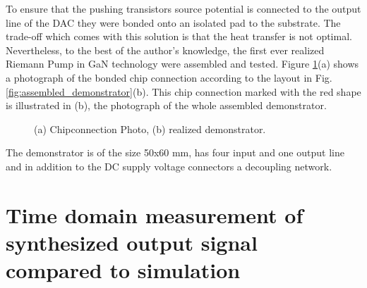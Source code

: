 \documentclass[journal]{IEEEtran}
\begin{document}
To ensure that the pushing transistors source potential is connected to the output line of the DAC they were bonded onto an isolated pad to the substrate.
The trade-off which comes with this solution is that the heat transfer is not optimal.\\
Nevertheless, to the best of the author's knowledge, the first ever realized Riemann Pump in GaN technology were assembled and tested.
Figure \ref{fig:photo_chipconnection_demonstrator}(a) shows a photograph of the bonded chip connection according to the layout in Fig. \ref{fig:assembled_demonstrator}(b).
This chip connection marked with the red shape is illustrated in (b), the photograph of the whole assembled demonstrator.
\begin{figure}[htb]
  \centering
	\begin{scriptsize}
  	\def\svgwidth{\columnwidth}
 	 
  	\caption{(a) Chipconnection Photo, (b) realized demonstrator.}
  	\label{fig:photo_chipconnection_demonstrator}
	\end{scriptsize}
\end{figure}
The demonstrator is of the size 50x60 mm, has four input and one output line and in addition to the DC supply voltage connectors a decoupling network.
%
\section{Time domain measurement of synthesized output signal compared to simulation}
\label{sec:experiment}
\end{document}
